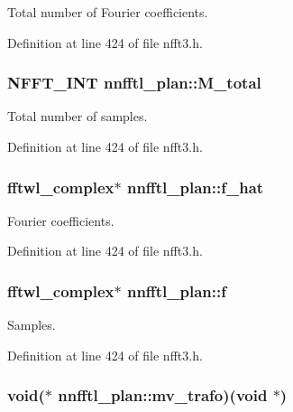 Total number of Fourier coefficients. 



Definition at line 424 of file nfft3.\-h.

\hypertarget{structnnfftl__plan_a2ad9f2c611d3f7caa3bdb91f7de24964}{
\subsubsection[{M\-\_\-total}]{\setlength{\rightskip}{0pt plus 5cm}N\-F\-F\-T\-\_\-\-I\-N\-T nnfftl\-\_\-plan\-::\-M\-\_\-total}}\label{structnnfftl__plan_a2ad9f2c611d3f7caa3bdb91f7de24964}


Total number of samples. 



Definition at line 424 of file nfft3.\-h.

\hypertarget{structnnfftl__plan_a97bc689ffe1f4c8eb99ee43cf408c662}{
\subsubsection[{f\-\_\-hat}]{\setlength{\rightskip}{0pt plus 5cm}fftwl\-\_\-complex$\ast$ nnfftl\-\_\-plan\-::f\-\_\-hat}}\label{structnnfftl__plan_a97bc689ffe1f4c8eb99ee43cf408c662}


Fourier coefficients. 



Definition at line 424 of file nfft3.\-h.

\hypertarget{structnnfftl__plan_a6aaa7904dbee73679d86060f1842a04e}{
\subsubsection[{f}]{\setlength{\rightskip}{0pt plus 5cm}fftwl\-\_\-complex$\ast$ nnfftl\-\_\-plan\-::f}}\label{structnnfftl__plan_a6aaa7904dbee73679d86060f1842a04e}


Samples. 



Definition at line 424 of file nfft3.\-h.

\hypertarget{structnnfftl__plan_a39b1bdd9a3eacd4ff3b809eeef01f364}{
\subsubsection[{mv\-\_\-trafo}]{\setlength{\rightskip}{0pt plus 5cm}void($\ast$ nnfftl\-\_\-plan\-::mv\-\_\-trafo)(void $\ast$)}}\label{structnnfftl__plan_a39b1bdd9a3eacd4ff3b809eeef01f364}


